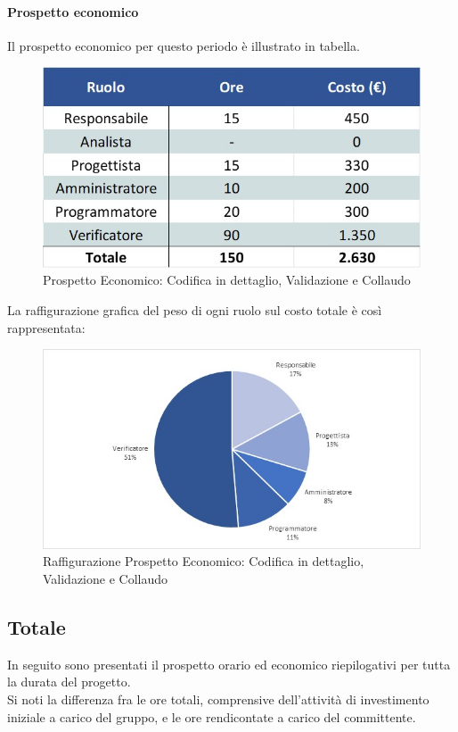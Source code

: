 \paragraph{Prospetto economico}
Il prospetto economico per questo periodo è illustrato in tabella. 
\begin{figure}[H]
	\centerline{\includegraphics[scale=0.7]{img/Preventivo/CodDettaglioValidazioneCollaudoEconomico.jpg}}
	\caption{Prospetto Economico: Codifica in dettaglio, Validazione e Collaudo}
	\clearpage
\end{figure}
La raffigurazione grafica del peso di ogni ruolo sul costo totale è così rappresentata: 
\begin{figure}[H]
	\centerline{\includegraphics[scale=0.9]{img/Preventivo/Torte/CodDettaglioValidazioneCollaudo.jpg}}
	\caption{Raffigurazione Prospetto Economico: Codifica in dettaglio, Validazione e Collaudo}
	\clearpage
\end{figure} 
\newpage
\subsection{Totale}
In seguito sono presentati il prospetto orario ed economico riepilogativi per tutta la durata del progetto.\\
Si noti la differenza fra le ore totali, comprensive dell'attività di investimento iniziale a carico del gruppo, e le ore rendicontate a carico del committente.
